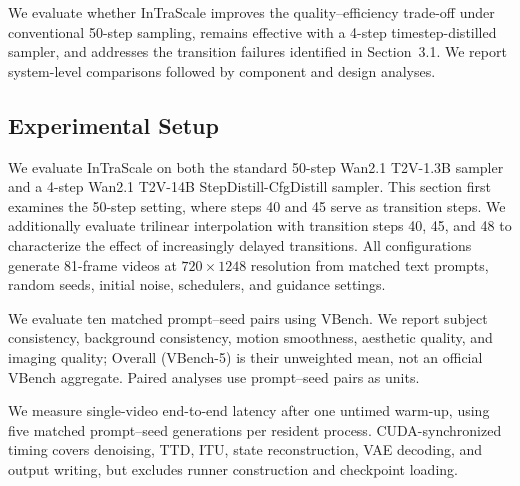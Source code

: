 \documentclass[letterpaper]{article} %
\begin{document}
We evaluate whether InTraScale improves the quality--efficiency trade-off
under conventional 50-step sampling, remains effective with a
4-step timestep-distilled sampler, and addresses the transition
failures identified in
Section~3.1. We report system-level comparisons followed by component and 
design analyses.

\subsection{Experimental Setup}
\label{sec:experimental_setup}

We evaluate InTraScale on both the standard 50-step Wan2.1 T2V-1.3B
sampler and a 4-step Wan2.1 T2V-14B StepDistill-CfgDistill sampler.
This section first examines the 50-step setting, where steps 40
and 45 serve as transition steps. We additionally evaluate trilinear
interpolation with transition steps 40, 45, and 48 to characterize the
effect of increasingly delayed transitions. All configurations generate
81-frame videos at \(720\times1248\) resolution from matched text prompts,
random seeds, initial noise, schedulers, and guidance settings.

We evaluate ten matched prompt--seed pairs using VBench. We report subject
consistency, background consistency, motion smoothness, aesthetic quality, and
imaging quality; Overall (VBench-5) is their unweighted mean, not an official
VBench aggregate. Paired analyses use prompt--seed pairs as units.

We measure single-video end-to-end latency after one untimed warm-up,
using five matched prompt--seed generations per resident process. CUDA-synchronized
timing covers denoising, TTD, ITU, state reconstruction, VAE decoding, and output
writing, but excludes runner construction and checkpoint loading.
\end{document}
